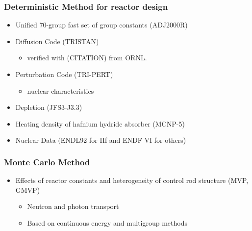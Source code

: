 \documentclass[9pt]{beamer}
\begin{document}
\begin{frame}
\frametitle{Deterministic Method for reactor design}
\begin{itemize}
\item Unified 70-group fast set of group constants (ADJ2000R) \cite{hazama_development_2002}
\item Diffusion Code (TRISTAN)
  \begin{itemize}
    \item verified with (CITATION) from \gls{ORNL}.
  \end{itemize}
\item Perturbation Code (TRI-PERT) 
  \begin{itemize}
  \item nuclear characteristics
  \end{itemize}
\item Depletion (JFS3-J3.3)
\item Heating density of hafnium hydride absorber (MCNP-5) \cite{mcnp_monte_2003}
\item Nuclear Data (ENDL92 for Hf and ENDF-VI for others)
\end{itemize}
\end{frame}

\begin{frame}
\frametitle{Monte Carlo Method}
\begin{itemize}
    \item Effects of reactor constants and heterogeneity of control rod structure (MVP, GMVP) \cite{nagaya_mvp/gmvp_2005}  
    \begin{itemize}
        \item Neutron and photon transport
        \item Based on continuous energy and multigroup methods
    \end{itemize}
\end{itemize}
\end{frame}
\end{document}
